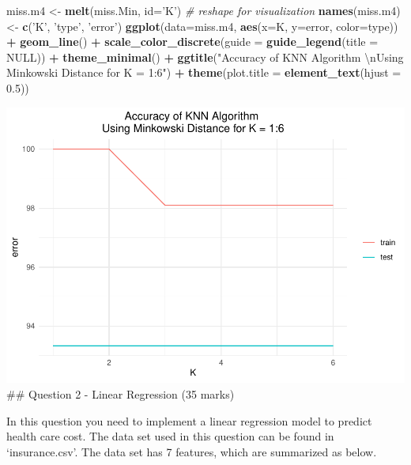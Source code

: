 \documentclass[
]{article}
\newenvironment{Shaded}{\begin{snugshade}}{\end{snugshade}}
\newcommand{\CharTok}[1]{\textcolor[rgb]{0.31,0.60,0.02}{#1}}
\newcommand{\CommentTok}[1]{\textcolor[rgb]{0.56,0.35,0.01}{\textit{#1}}}
\newcommand{\DataTypeTok}[1]{\textcolor[rgb]{0.13,0.29,0.53}{#1}}
\newcommand{\FloatTok}[1]{\textcolor[rgb]{0.00,0.00,0.81}{#1}}
\newcommand{\KeywordTok}[1]{\textcolor[rgb]{0.13,0.29,0.53}{\textbf{#1}}}
\newcommand{\NormalTok}[1]{#1}
\newcommand{\OperatorTok}[1]{\textcolor[rgb]{0.81,0.36,0.00}{\textbf{#1}}}
\newcommand{\OtherTok}[1]{\textcolor[rgb]{0.56,0.35,0.01}{#1}}
\newcommand{\StringTok}[1]{\textcolor[rgb]{0.31,0.60,0.02}{#1}}
\begin{document}
\begin{Shaded}
\begin{Highlighting}[]
\NormalTok{miss.m4 <-}\StringTok{ }\KeywordTok{melt}\NormalTok{(miss.Min, }\DataTypeTok{id=}\StringTok{'K'}\NormalTok{) }\CommentTok{# reshape for visualization}
\KeywordTok{names}\NormalTok{(miss.m4) <-}\StringTok{ }\KeywordTok{c}\NormalTok{(}\StringTok{'K'}\NormalTok{, }\StringTok{'type'}\NormalTok{, }\StringTok{'error'}\NormalTok{)}
\KeywordTok{ggplot}\NormalTok{(}\DataTypeTok{data=}\NormalTok{miss.m4, }\KeywordTok{aes}\NormalTok{(}\DataTypeTok{x=}\NormalTok{K, }\DataTypeTok{y=}\NormalTok{error, }\DataTypeTok{color=}\NormalTok{type)) }\OperatorTok{+}\StringTok{ }\KeywordTok{geom_line}\NormalTok{() }\OperatorTok{+}
\StringTok{       }\KeywordTok{scale_color_discrete}\NormalTok{(}\DataTypeTok{guide =} \KeywordTok{guide_legend}\NormalTok{(}\DataTypeTok{title =} \OtherTok{NULL}\NormalTok{)) }\OperatorTok{+}\StringTok{ }\KeywordTok{theme_minimal}\NormalTok{() }\OperatorTok{+}
\StringTok{       }\KeywordTok{ggtitle}\NormalTok{(}\StringTok{"Accuracy of KNN Algorithm }\CharTok{\textbackslash{}n}\StringTok{Using Minkowski Distance for K = 1:6"}\NormalTok{) }\OperatorTok{+}\StringTok{ }\KeywordTok{theme}\NormalTok{(}\DataTypeTok{plot.title =} \KeywordTok{element_text}\NormalTok{(}\DataTypeTok{hjust =} \FloatTok{0.5}\NormalTok{)) }
\end{Highlighting}
\end{Shaded}

\includegraphics{assessment-1_files/figure-latex/unnamed-chunk-8-4.pdf}
\#\# Question 2 - Linear Regression (35 marks)

In this question you need to implement a linear regression model to
predict health care cost. The data set used in this question can be
found in `insurance.csv'. The data set has 7 features, which are
summarized as below.
\end{document}

